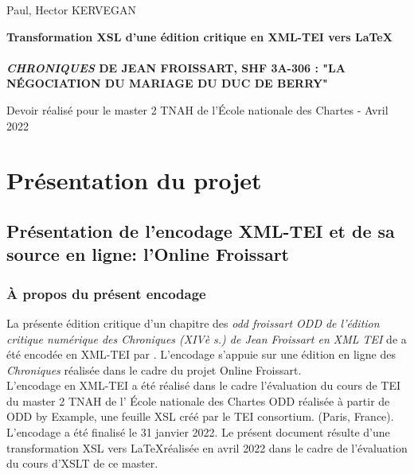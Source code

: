 \documentclass[12pt, a4paper]{article}
\begin{document}
            
            
            \begin{titlepage}
            \begin{center}
            \large
            Paul, Hector KERVEGAN
            
            \Large
            \vfill
            \textbf{Transformation XSL d'une édition critique en XML-TEI vers \LaTeX}
            \\~\\
            \textbf{\textit{CHRONIQUES} DE JEAN FROISSART, SHF 3A-306 : "LA NÉGOCIATION DU MARIAGE DU DUC DE BERRY"}
            \vfill
            
            \large	
            \vfill Devoir réalisé pour le master 2 TNAH de l'École nationale des Chartes - Avril 2022
            \end{center}
            \end{titlepage}
            
            
            
                \section{Présentation du projet}
                \subsection{Présentation de l'encodage XML-TEI et de sa source en ligne: l'Online Froissart}
                
        
        
        \subsubsection{À propos du présent encodage}
        La présente édition critique d'un chapitre des \textit{odd froissart ODD de l'édition critique numérique des Chroniques (XIVè s.) de Jean Froissart en XML TEI} de  a été encodée en XML-TEI par . L'encodage s'appuie sur une édition en ligne des \textit{Chroniques} 
            réalisée dans le cadre du projet Online Froissart.\\ \indent L'encodage en XML-TEI a été 
            réalisé dans le cadre l'évaluation du cours de TEI du master 2 TNAH de l'
               École nationale des Chartes
               ODD réalisée à partir de ODD by Example, une feuille XSL créé par le TEI consortium.
             (Paris, France). L'encodage a été finalisé le 31 janvier 2022. Le présent document résulte d'une transformation XSL vers \LaTeX  réalisée
            en avril 2022 dans le cadre de l'évaluation du cours d'XSLT de ce master.
        
\end{document}
